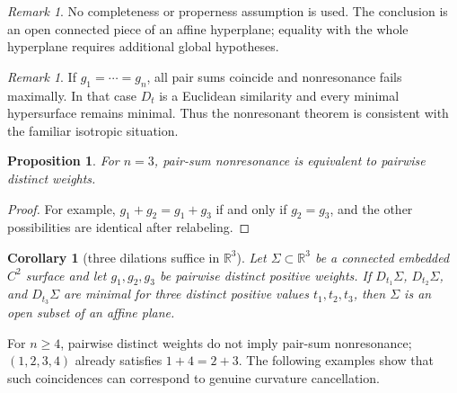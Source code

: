 \documentclass[preprint,12pt]{elsarticle}
\numberwithin{equation}{section}
\newtheorem{proposition}[theorem]{Proposition}
\newtheorem{corollary}[theorem]{Corollary}
\theoremstyle{definition}\newtheorem{definition}[theorem]{Definition}
\theoremstyle{remark}\newtheorem{remark}[theorem]{Remark}
\begin{document}
\begin{remark}\label{rem:global}
No completeness or properness assumption is used. The conclusion is an open connected piece of an affine hyperplane; equality with the whole hyperplane requires additional global hypotheses.
\end{remark}

\begin{remark}\label{rem:isotropic}
If $g_1=\cdots=g_n$, all pair sums coincide and nonresonance fails maximally. In that case $D_t$ is a Euclidean similarity and every minimal hypersurface remains minimal. Thus the nonresonant theorem is consistent with the familiar isotropic situation.
\end{remark}

\begin{proposition}\label{prop:3weights}
For $n=3$, pair-sum nonresonance is equivalent to pairwise distinct weights.
\end{proposition}
\begin{proof}
For example, $g_1+g_2=g_1+g_3$ if and only if $g_2=g_3$, and the other possibilities are identical after relabeling.
\end{proof}

\begin{corollary}[three dilations suffice in $\mathbb R^3$]\label{cor:3d}
Let $\Sigma\subset\mathbb R^3$ be a connected embedded $C^2$ surface and let $g_1,g_2,g_3$ be pairwise distinct positive weights. If $D_{t_1}\Sigma$, $D_{t_2}\Sigma$, and $D_{t_3}\Sigma$ are minimal for three distinct positive values $t_1,t_2,t_3$, then $\Sigma$ is an open subset of an affine plane.
\end{corollary}

For $n\ge4$, pairwise distinct weights do not imply pair-sum nonresonance; $(1,2,3,4)$ already satisfies $1+4=2+3$. The following examples show that such coincidences can correspond to genuine curvature cancellation.
\end{document}
